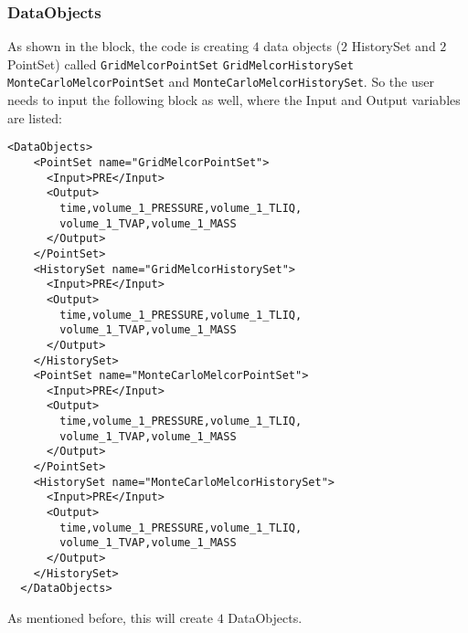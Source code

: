 \subsubsection{DataObjects}
As shown in the  block, the code is creating $4$ data objects ($2$ HistorySet and $2$ PointSet)
called \texttt{GridMelcorPointSet} \texttt{GridMelcorHistorySet} \texttt{MonteCarloMelcorPointSet} and
 \texttt{MonteCarloMelcorHistorySet}.
%
So the user needs to input the following block as well, where the Input and Output variables are listed:
\begin{lstlisting}[style=XML]
  <DataObjects>
    <PointSet name="GridMelcorPointSet">
      <Input>PRE</Input>
      <Output>
        time,volume_1_PRESSURE,volume_1_TLIQ,
        volume_1_TVAP,volume_1_MASS
      </Output>
    </PointSet>
    <HistorySet name="GridMelcorHistorySet">
      <Input>PRE</Input>
      <Output>
        time,volume_1_PRESSURE,volume_1_TLIQ,
        volume_1_TVAP,volume_1_MASS
      </Output>
    </HistorySet>
    <PointSet name="MonteCarloMelcorPointSet">
      <Input>PRE</Input>
      <Output>
        time,volume_1_PRESSURE,volume_1_TLIQ,
        volume_1_TVAP,volume_1_MASS
      </Output>
    </PointSet>
    <HistorySet name="MonteCarloMelcorHistorySet">
      <Input>PRE</Input>
      <Output>
        time,volume_1_PRESSURE,volume_1_TLIQ,
        volume_1_TVAP,volume_1_MASS
      </Output>
    </HistorySet>
  </DataObjects>
\end{lstlisting}
As mentioned before, this will create $4$ DataObjects.
%
